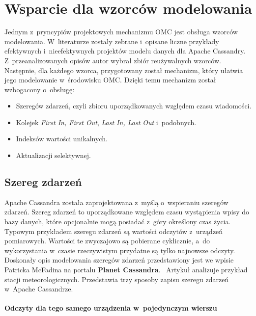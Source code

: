 \section{Wsparcie dla wzorców modelowania}
\label{sec:ocm_data_modeling_support}

Jednym z~pryncypiów projektowych mechanizmu OMC jest obsługa wzorców modelowania. W~literaturze zostały zebrane i~opisane liczne przykłady efektywnych i~nieefektywnych projektów modelu danych dla Apache Cassandry. Z~przeanalizowanych opisów autor wybrał zbiór reużywalnych wzorców. Następnie, dla każdego wzorca, przygotowany został mechanizm, który ułatwia jego modelowanie w~środowisku OMC. Dzięki temu mechanizm został wzbogacony o~obsługę:

\begin{itemize}
	\item Szeregów zdarzeń, czyli zbioru uporządkowanych względem czasu wiadomości.
	\item Kolejek \emph{First In, First Out}, \emph{Last In, Last Out} i~podobnych.
	\item Indeksów wartości unikalnych. 
	\item Aktualizacji selektywnej.
\end{itemize}

\subsection{Szereg zdarzeń}
\label{sec:time_series_modeling}

Apache Cassandra została zaprojektowana z~myślą o~wspieraniu szeregów zdarzeń. Szereg zdarzeń to uporządkowane względem czasu wystąpienia wpisy do bazy danych, które opcjonalnie mogą posiadać z~góry określony czas życia. Typowym przykładem szeregu zdarzeń są wartości odczytów z~urządzeń pomiarowych. Wartości te zwyczajowo są pobierane cyklicznie, a~do wykorzystania w~czasie rzeczywistym przydatne są tylko najnowsze odczyty. Doskonały opis modelowania szeregów zdarzeń przedstawiony jest we wpisie Patricka McFadina na portalu \textbf{Planet Cassandra}.~\cite{time_series_modeling_pattern} Artykuł analizuje przykład stacji meteorologicznych. Przedstawia trzy sposoby zapisu szeregu zdarzeń w~Apache Cassandrze. 

\paragraph{Odczyty dla tego samego urządzenia w~pojedynczym wierszu} 

